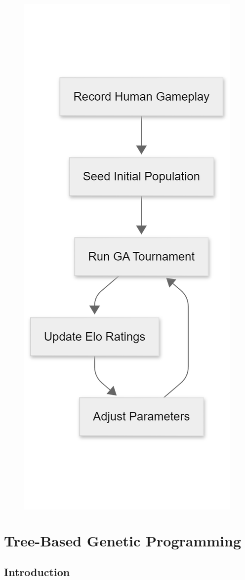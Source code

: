 \documentclass[sigconf]{acmart} %
\begin{document}
\begin{figure}
	\centering
	\includegraphics[width=0.7\linewidth]{pictures/workflow}
	\caption[Critical path for future work]{}
	\label{fig:workflow}
\end{figure}

\section{Tree-Based Genetic Programming}
\label{sec:tree_train}  %
\subsection{Introduction}
\end{document}

